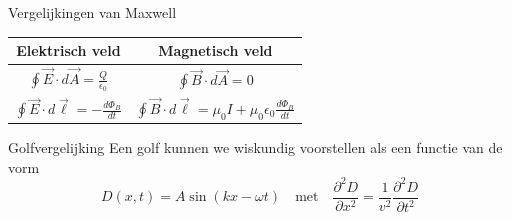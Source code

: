 

\begin{summ}{Vergelijkingen van Maxwell}
    \vspace{-0.3cm}
    \begin{center}
        \def\arraystretch{2}
        \begin{tabular}{c|c}
            Elektrisch veld & Magnetisch veld \\ \hline
            $\oint \Vec{E} \cdot d\Vec{A} = \frac{Q}{\epsilon_0}$ 
                &  $\oint \Vec{B} \cdot d\Vec{A} = 0$ \\
            $\oint \Vec{E} \cdot d\Vec{\ell} = -\frac{d\Phi_B}{dt}$ 
                &  $\oint \Vec{B} \cdot d\Vec{\ell} = \mu_0I + \mu_0 \epsilon_0 \frac{d\Phi_B}{dt}$ \\
        \end{tabular}
    \end{center}
\end{summ}

\newpage

\begin{theo}[Golfvergelijking]{Golfvergelijking}
    Een golf kunnen we wiskundig voorstellen als een functie van de vorm
    \begin{equation*}
        D(x,t) = A\sin(kx-\omega t) \quad \text{met} \quad \frac{\partial^2 D}{\partial x^2} = \frac{1}{v^2} \frac{\partial^2 D}{\partial t^2}
    \end{equation*}
    \vspace{-0.3cm}
\end{theo}

